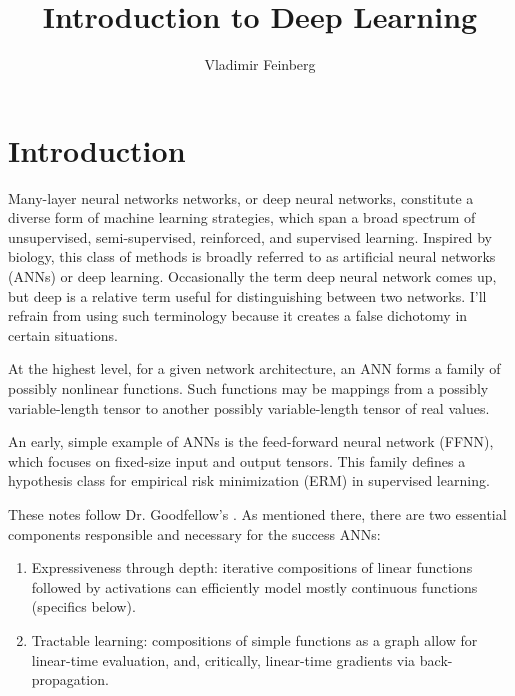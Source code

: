 \documentclass{article}
\title{Introduction to Deep Learning}
\author{Vladimir Feinberg}
\begin{document}
\maketitle

\section{Introduction}

Many-layer neural networks networks, or deep neural networks, constitute a diverse form of machine learning strategies, which span a broad spectrum of unsupervised, semi-supervised, reinforced, and supervised learning. Inspired by biology, this class of methods is broadly referred to as artificial neural networks (ANNs) or deep learning. Occasionally the term deep neural network comes up, but deep is a relative term useful for distinguishing between two networks. I'll refrain from using such terminology because it creates a false dichotomy in certain situations.

At the highest level, for a given network architecture, an ANN forms a family of possibly nonlinear functions. Such functions may be mappings from a possibly variable-length tensor to another possibly variable-length tensor of real values.

An early, simple example of ANNs is the feed-forward neural network (FFNN), which focuses on fixed-size input and output tensors. This family defines a hypothesis class for empirical risk minimization (ERM) in supervised learning.

These notes follow Dr. Goodfellow's . As mentioned there, there are two essential components responsible and necessary for the success ANNs:
\begin{enumerate}
\item Expressiveness through depth: iterative compositions of linear functions followed by activations can efficiently model mostly continuous functions (specifics below).
\item Tractable learning: compositions of simple functions as a graph allow for linear-time evaluation, and, critically, linear-time gradients via back-propagation.
\end{enumerate}
\end{document}
